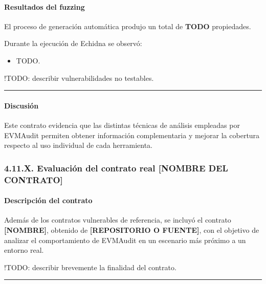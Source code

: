 \paragraph{Resultados del fuzzing}\label{resultados-del-fuzzing}

El proceso de generación automática produjo un total de \textbf{TODO}
propiedades.

Durante la ejecución de Echidna se observó:

\begin{itemize}
\tightlist
\item
  TODO.
\end{itemize}

!TODO: describir vulnerabilidades no testables.

\begin{center}\rule{0.5\linewidth}{0.5pt}\end{center}

\paragraph{Discusión}\label{discusiuxf3n-1}

Este contrato evidencia que las distintas técnicas de análisis empleadas
por EVMAudit permiten obtener información complementaria y mejorar la
cobertura respecto al uso individual de cada herramienta.

\subsubsection{4.11.X. Evaluación del contrato real {[}NOMBRE DEL
CONTRATO{]}}\label{x.-evaluaciuxf3n-del-contrato-real-nombre-del-contrato}

\paragraph{Descripción del
contrato}\label{descripciuxf3n-del-contrato-2}

Además de los contratos vulnerables de referencia, se incluyó el
contrato \textbf{{[}NOMBRE{]}}, obtenido de \textbf{{[}REPOSITORIO O
FUENTE{]}}, con el objetivo de analizar el comportamiento de EVMAudit en
un escenario más próximo a un entorno real.

!TODO: describir brevemente la finalidad del contrato.

\begin{center}\rule{0.5\linewidth}{0.5pt}\end{center}

